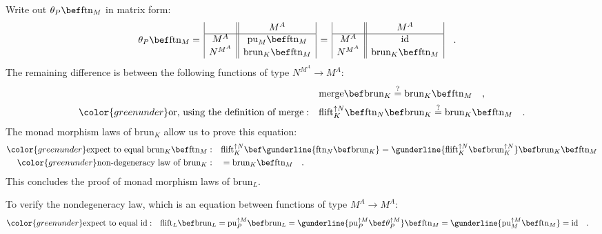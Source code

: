Write out $\theta_{P}\bef\text{ftn}_{M}$ in matrix form:
\begin{align*}
 & \theta_{P}\bef\text{ftn}_{M}=\,\begin{array}{|c||c|}
 & M^{A}\\
\hline M^{A} & \text{pu}_{M}\bef\text{ftn}_{M}\\
N^{M^{A}} & \text{brun}_{K}\bef\text{ftn}_{M}
\end{array}\,=\,\begin{array}{|c||c|}
 & M^{A}\\
\hline M^{A} & \text{id}\\
N^{M^{A}} & \text{brun}_{K}\bef\text{ftn}_{M}
\end{array}\quad.
\end{align*}
The remaining difference is between the following functions of type
$N^{M^{A}}\rightarrow M^{A}$:
\begin{align*}
 & \text{merge}\bef\text{brun}_{K}\overset{?}{=}\text{brun}_{K}\bef\text{ftn}_{M}\quad,\\
{\color{greenunder}\text{or, using the definition of }\text{merge}:}\quad & \text{flift}_{K}^{\uparrow N}\bef\text{ftn}_{N}\bef\text{brun}_{K}\overset{?}{=}\text{brun}_{K}\bef\text{ftn}_{M}\quad.
\end{align*}
The monad morphism laws of $\text{brun}_{K}$ allow us to prove this
equation:
\begin{align*}
{\color{greenunder}\text{expect to equal }\text{brun}_{K}\bef\text{ftn}_{M}:}\quad & \text{flift}_{K}^{\uparrow N}\bef\gunderline{\text{ftn}_{N}\bef\text{brun}_{K}}=\gunderline{\text{flift}_{K}^{\uparrow N}\bef\text{brun}_{K}^{\uparrow N}}\bef\text{brun}_{K}\bef\text{ftn}_{M}\\
{\color{greenunder}\text{non-degeneracy law of }\text{brun}_{K}:}\quad & =\text{brun}_{K}\bef\text{ftn}_{M}\quad.
\end{align*}
This concludes the proof of monad morphism laws of $\text{brun}_{L}$.

To verify the nondegeneracy law, which is an equation between functions
of type $M^{A}\rightarrow M^{A}$:
\begin{align*}
{\color{greenunder}\text{expect to equal }\text{id}:}\quad & \text{flift}_{L}\bef\text{brun}_{L}=\text{pu}_{P}^{\uparrow M}\bef\text{brun}_{L}=\gunderline{\text{pu}_{P}^{\uparrow M}\bef\theta_{P}^{\uparrow M}}\bef\text{ftn}_{M}=\gunderline{\text{pu}_{M}^{\uparrow M}\bef\text{ftn}_{M}}=\text{id}\quad.
\end{align*}


